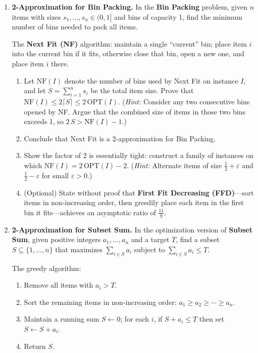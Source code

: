 \documentclass[9pt]{book}
\begin{document}
\begin{enumerate}[label=\arabic*.]

\item \textbf{2-Approximation for Bin Packing.}
In the \textbf{Bin Packing} problem, given $n$ items with sizes $s_1,\ldots,s_n\in(0,1]$ and
bins of capacity 1, find the minimum number of bins needed to pack all items.

The \textbf{Next Fit (NF)} algorithm: maintain a single ``current'' bin;
        place item $i$ into the current bin if it fits, otherwise close that bin, open a new one,
        and place item $i$ there.
  
\begin{enumerate}[label=(\alph*)]
  \item Let $\mathrm{NF}(I)$ denote the number of bins used by Next Fit on instance $I$, and
        let $S = \sum_{i=1}^n s_i$ be the total item size.
        Prove that $\mathrm{NF}(I) \le 2\lceil S \rceil \le 2\,\mathrm{OPT}(I)$.
        (\textit{Hint:} Consider any two consecutive bins opened by NF.
        Argue that the combined size of items in those two bins exceeds 1,
        so $2\,S > \mathrm{NF}(I) - 1$.)
  \item Conclude that Next Fit is a 2-approximation for Bin Packing.
  \item Show the factor of 2 is essentially tight: construct a family of instances
        on which $\mathrm{NF}(I) = 2\,\mathrm{OPT}(I) - 2$.
        (\textit{Hint:} Alternate items of size $\tfrac{1}{2}+\varepsilon$ and $\tfrac{1}{2}-\varepsilon$
        for small $\varepsilon>0$.)
  \item (Optional) State without proof that \textbf{First Fit Decreasing (FFD)}---sort items
        in non-increasing order, then greedily place each item in the first bin it fits---achieves
        an asymptotic ratio of $\tfrac{11}{9}$.
\end{enumerate}

\bigskip

\item \textbf{2-Approximation for Subset Sum.}
In the optimization version of \textbf{Subset Sum}, given positive integers $a_1,\ldots,a_n$
and a target $T$, find a subset $S\subseteq\{1,\ldots,n\}$ that maximizes
$\sum_{i\in S} a_i$ subject to $\sum_{i\in S} a_i \le T$.

The greedy algorithm:
        \begin{enumerate}[label=(\roman*)]
          \item Remove all items with $a_i > T$.
          \item Sort the remaining items in non-increasing order: $a_1 \ge a_2 \ge \cdots \ge a_n$.
          \item Maintain a running sum $S \gets 0$; for each $i$, if $S + a_i \le T$ then set $S \gets S + a_i$.
          \item Return $S$.
        \end{enumerate}
  

\end{enumerate}
\end{document}
